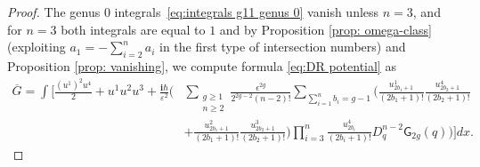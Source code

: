 \documentclass{amsart}
\numberwithin{equation}{section} %
\theoremstyle{plain}
\theoremstyle{remark}
\def\cxi{\mathbf{i}}
\begin{document}
\begin{proof}
The genus $0$ integrals~\eqref{eq:integrals g11 genus 0} vanish unless $n=3$, and for $n=3$ both integrals are equal to $1$ and by Proposition \ref{prop: omega-class} (exploiting $a_1 = -\sum_{i=2}^n a_i$ in the first type of intersection numbers) and Proposition \ref{prop: vanishing}, we compute formula \eqref{eq:DR potential} as
\begin{align*}
\overline{G}=\int \Big[ \frac{(u^1)^2 u^4}{2} + u^1 u^2 u^3 + \frac{\cxi \hbar}{\varepsilon^2} \Big(& \sum_{\substack{g \geq 1 \\ n\geq 2}} \frac{\epsilon^{2g}}{2^{2g-2}(n-2)!} \sum_{\sum_{i=1}^n b_i = g-1} \Big(\frac{u^1_{2b_1+1}}{(2b_1+1)!}\frac{u^4_{2b_2+1}}{(2b_2+1)!}\\
&+ \frac{u^2_{2b_1+1}}{(2b_1+1)!}\frac{u^3_{2b_2+1}}{(2b_2+1)!}\Big)\prod_{i=3}^n \frac{u^4_{2b_i}}{(2b_i+1)!} D_q^{n-2} \mathsf{G}_{2g}(q)\Big)\Big]dx.
\end{align*}


\end{proof}
\end{document}
